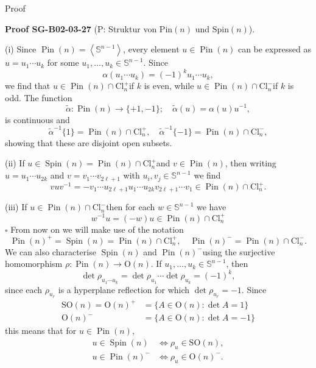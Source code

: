 \documentclass[10pt, letterpaper]{article}
\newcommand{\Spin}{\mathrm{Spin}}
\newcommand{\Pin}{\mathrm{Pin}}
\newcommand{\CustomHeading}[3]{%
  \par\medskip\noindent%
  \textbf{#1 #2} \textnormal{(#3)}.\enskip%
}
\newenvironment{PROOF}[2]{\begin{unitbox}\CustomHeading{Proof}{#1}{#2}}{\end{unitbox}}
\begin{document}
Proof

\begin{PROOF}{SG-B02-03-27}{P: Struktur von \(\Pin(n)\) und \(\Spin(n)\)}
(i) Since $\operatorname{Pin}(n)=\left\langle\mathbb{S}^{n-1}\right\rangle$, every element $u \in \operatorname{Pin}(n)$ can be expressed as $u=u_{1} \cdots u_{k}$ for some $u_{1}, \ldots, u_{k} \in \mathbb{S}^{n-1}$. Since
$$
\alpha\left(u_{1} \cdots u_{k}\right)=(-1)^{k} u_{1} \cdots u_{k},
$$
we find that $u \in \operatorname{Pin}(n) \cap \mathrm{Cl}_{n}^{+}$if $k$ is even, while $u \in \operatorname{Pin}(n) \cap \mathrm{Cl}_{n}^{-}$if $k$ is odd. The function
$$
\widetilde{\alpha}: \operatorname{Pin}(n) \longrightarrow\{+1,-1\} ; \quad \widetilde{\alpha}(u)=\alpha(u) u^{-1},
$$
is continuous and
$$
\widetilde{\alpha}^{-1}\{1\}=\operatorname{Pin}(n) \cap \mathrm{Cl}_{n}^{+}, \quad \widetilde{\alpha}^{-1}\{-1\}=\operatorname{Pin}(n) \cap \mathrm{Cl}_{n}^{-},
$$
showing that these are disjoint open subsets.


(ii) If $u \in \operatorname{Spin}(n)=\operatorname{Pin}(n) \cap \mathrm{Cl}_{n}^{+}$and $v \in \operatorname{Pin}(n)$, then writing $u=u_{1} \cdots u_{2 k}$ and $v=v_{1} \cdots v_{2 \ell+1}$ with $u_{i}, v_{j} \in \mathbb{S}^{n-1}$ we find
$$
v u v^{-1}=-v_{1} \cdots u_{2 \ell+1} u_{1} \cdots u_{2 k} v_{2 \ell+1} \cdots v_{1} \in \operatorname{Pin}(n) \cap \mathrm{Cl}_{n}^{+} .
$$

(iii) If $u \in \operatorname{Pin}(n) \cap \mathrm{Cl}_{n}^{-}$then for each $w \in \mathbb{S}^{n-1}$ we have
$$
w^{-1} u=(-w) u \in \operatorname{Pin}(n) \cap \mathrm{Cl}_{n}^{+}
$$ \(\square\)
From now on we will make use of the notation
$$
\operatorname{Pin}(n)^{+}=\operatorname{Spin}(n)=\operatorname{Pin}(n) \cap \mathrm{Cl}_{n}^{+}, \quad \operatorname{Pin}(n)^{-}=\operatorname{Pin}(n) \cap \mathrm{Cl}_{n}^{-} .
$$
We can also characterise $\operatorname{Spin}(n)$ and $\operatorname{Pin}(n)^{-}$using the surjective homomorphism $\rho: \operatorname{Pin}(n) \longrightarrow \mathrm{O}(n)$. If $u_{1}, \ldots, u_{k} \in \mathbb{S}^{n-1}$, then
$$
\operatorname{det} \rho_{u_{1} \cdots u_{k}}=\operatorname{det} \rho_{u_{1}} \cdots \operatorname{det} \rho_{u_{k}}=(-1)^{k},
$$
since each $\rho_{u_{r}}$ is a hyperplane reflection for which $\operatorname{det} \rho_{u_{r}}=-1$. Since
$$
\begin{aligned}
\mathrm{SO}(n)=\mathrm{O}(n)^{+} & =\{A \in \mathrm{O}(n): \operatorname{det} A=1\} \\
\mathrm{O}(n)^{-} & =\{A \in \mathrm{O}(n): \operatorname{det} A=-1\}
\end{aligned}
$$
this means that for $u \in \operatorname{Pin}(n)$,
$$
\begin{aligned}
u \in \operatorname{Spin}(n) & \Longleftrightarrow \rho_{u} \in \mathrm{SO}(n), \\
u \in \operatorname{Pin}(n)^{-} & \Longleftrightarrow \rho_{u} \in \mathrm{O}(n)^{-} .
\end{aligned}
$$
\end{PROOF}
\end{document}

